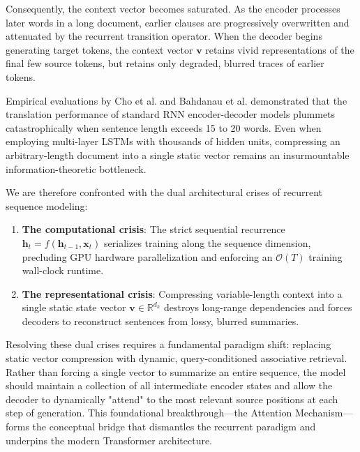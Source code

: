\documentclass[../../main.tex]{subfiles}
\begin{document}
Consequently, the context vector becomes saturated. As the encoder processes later words in a long document, earlier clauses are progressively overwritten and attenuated by the recurrent transition operator. When the decoder begins generating target tokens, the context vector $\mathbf{v}$ retains vivid representations of the final few source tokens, but retains only degraded, blurred traces of earlier tokens.

Empirical evaluations by Cho et al. \citep{cho2014} and Bahdanau et al. \citep{bahdanau2014} demonstrated that the translation performance of standard RNN encoder-decoder models plummets catastrophically when sentence length exceeds 15 to 20 words. Even when employing multi-layer LSTMs with thousands of hidden units, compressing an arbitrary-length document into a single static vector remains an insurmountable information-theoretic bottleneck.

We are therefore confronted with the dual architectural crises of recurrent sequence modeling:
\begin{enumerate}
    \item \textbf{The computational crisis}: The strict sequential recurrence $\mathbf{h}_t = f(\mathbf{h}_{t-1}, \mathbf{x}_t)$ serializes training along the sequence dimension, precluding GPU hardware parallelization and enforcing an $\mathcal{O}(T)$ training wall-clock runtime.
    \item \textbf{The representational crisis}: Compressing variable-length context into a single static state vector $\mathbf{v} \in \mathbb{R}^{d_h}$ destroys long-range dependencies and forces decoders to reconstruct sentences from lossy, blurred summaries.
\end{enumerate}

Resolving these dual crises requires a fundamental paradigm shift: replacing static vector compression with dynamic, query-conditioned associative retrieval. Rather than forcing a single vector to summarize an entire sequence, the model should maintain a collection of all intermediate encoder states and allow the decoder to dynamically "attend" to the most relevant source positions at each step of generation. This foundational breakthrough—the Attention Mechanism—forms the conceptual bridge that dismantles the recurrent paradigm and underpins the modern Transformer architecture.

\clearpage\thispagestyle{empty}\null\clearpage
\end{document}
